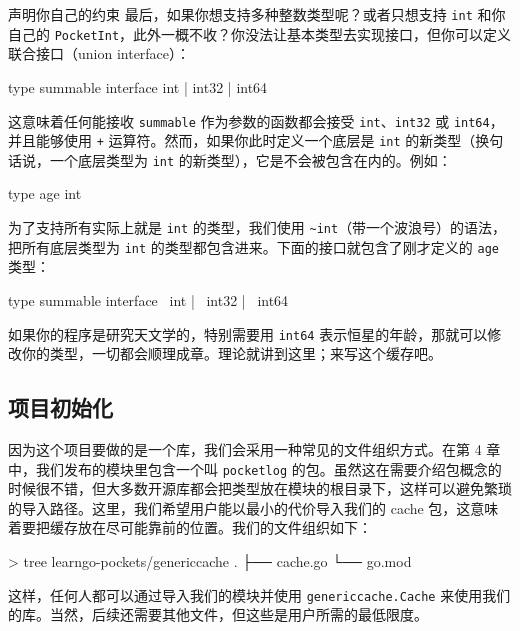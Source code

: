 \begin{infobox}{声明你自己的约束}
最后，如果你想支持多种整数类型呢？或者只想支持 \texttt{int} 和你自己的 \texttt{PocketInt}，此外一概不收？你没法让基本类型去实现接口，但你可以定义联合接口（union interface）：

\begin{gocode}[]
type summable interface {
    int | int32 | int64
}
\end{gocode}

这意味着任何能接收 \texttt{summable} 作为参数的函数都会接受 \texttt{int}、\texttt{int32} 或 \texttt{int64}，并且能够使用 \texttt{+} 运算符。然而，如果你此时定义一个底层是 \texttt{int} 的新类型（换句话说，一个底层类型为 \texttt{int} 的新类型），它是不会被包含在内的。例如：

\begin{gocode}[]
type age int
\end{gocode}

为了支持所有实际上就是 \texttt{int} 的类型，我们使用 \texttt{\textasciitilde int}（带一个波浪号）的语法，把所有底层类型为 \texttt{int} 的类型都包含进来。下面的接口就包含了刚才定义的 \texttt{age} 类型：

\begin{gocode}[]
type summable interface {
    ~int | ~int32 | ~int64
}
\end{gocode}

如果你的程序是研究天文学的，特别需要用 \texttt{int64} 表示恒星的年龄，那就可以修改你的类型，一切都会顺理成章。理论就讲到这里；来写这个缓存吧。
\end{infobox}

\subsection{项目初始化}

因为这个项目要做的是一个库，我们会采用一种常见的文件组织方式。在第 4 章中，我们发布的模块里包含一个叫 \texttt{pocketlog} 的包。虽然这在需要介绍包概念的时候很不错，但大多数开源库都会把类型放在模块的根目录下，这样可以避免繁琐的导入路径。这里，我们希望用户能以最小的代价导入我们的 cache 包，这意味着要把缓存放在尽可能靠前的位置。我们的文件组织如下：

\begin{shellcode}[]
> tree learngo-pockets/genericcache
.
├── cache.go
└── go.mod
\end{shellcode}

这样，任何人都可以通过导入我们的模块并使用 \texttt{genericcache.Cache} 来使用我们的库。当然，后续还需要其他文件，但这些是用户所需的最低限度。

